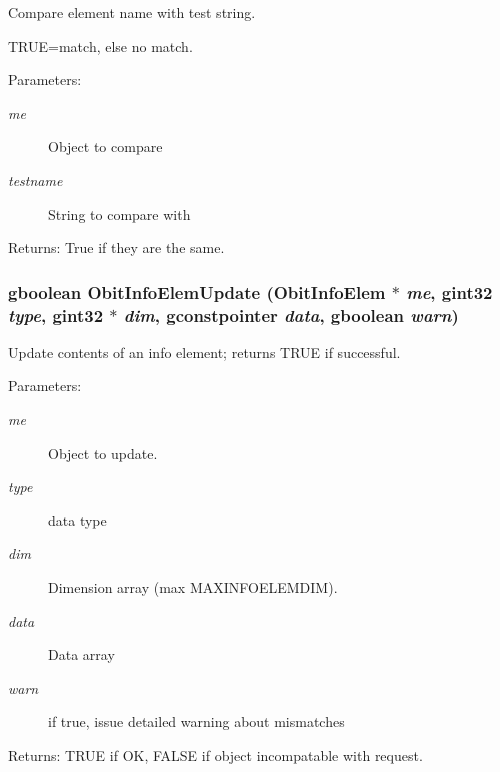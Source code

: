 Compare element name with test string. 

TRUE=match, else no match. \begin{Desc}
\item[Parameters:]
\begin{description}
\item[{\em me}]Object to compare \item[{\em testname}]String to compare with \end{description}
\end{Desc}
\begin{Desc}
\item[Returns:]True if they are the same. \end{Desc}
\subsubsection{\setlength{\rightskip}{0pt plus 5cm}gboolean Obit\-Info\-Elem\-Update ({\bf Obit\-Info\-Elem} $\ast$ {\em me}, gint32 {\em type}, gint32 $\ast$ {\em dim}, gconstpointer {\em data}, gboolean {\em warn})}\label{ObitInfoElem_8h_a7}


Update contents of an info element; returns TRUE if successful. 

\begin{Desc}
\item[Parameters:]
\begin{description}
\item[{\em me}]Object to update. \item[{\em type}]data type \item[{\em dim}]Dimension array (max MAXINFOELEMDIM). \item[{\em data}]Data array \item[{\em warn}]if true, issue detailed warning about mismatches \end{description}
\end{Desc}
\begin{Desc}
\item[Returns:]TRUE if OK, FALSE if object incompatable with request. \end{Desc}
